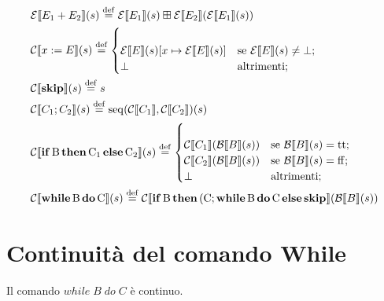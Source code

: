 \begin{align*}
&\denot{\calE}{E_1 + E_2}{s} \defeq \denot{\calE}{E_1}{s} \conadd \denot{\calE}{E_2}{\denot{\calE}{E_1}{s}}\\
&\denot{\calC}{x \weq E}{s} \defeq \begin{cases}\\
        \assign{\denot{\calE}{E}{s}}{x}{\denot{\calE}{E}{s}} & \text{se } \denot{\calE}{E}{s} \neq \bot;\\
        \bot & \text{altrimenti};
        \end{cases}\\
&\denot{\calC}{\kw{skip}}{s} \defeq s\\
&\denot{\calC}{C_1 ; C_2}{s} \defeq \mathrm{seq}(\calC \llbracket C_1 \rrbracket, \calC \llbracket C_2 \rrbracket)(s)\\
&\denot{\calC}{\condif{B}{C_1}{C_2}}{s} \defeq \begin{cases}\\
        \denot{\calC}{C_1}{\denot{\calB}{B}{s}} & \text{se } \denot{\calB}{B}{s} = \ttv ;\\
        \denot{\calC}{C_2}{\denot{\calB}{B}{s}} & \text{se } \denot{\calB}{B}{s} = \ffv ;\\
        \bot & \text{altrimenti};
        \end{cases}\\
&\denot{\calC}{\while{B}{C}}{s} \defeq \denot{\calC}{\condif{B}{(C ; \while{B}{C}}{\kw{skip}}}{\denot{\calB}{B}{s}}
\end{align*}

\section{Continuità del comando While}
Il comando $ while\; B\; do\; C $ è continuo.

